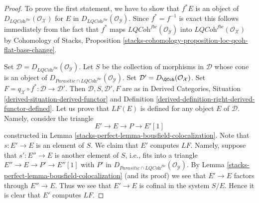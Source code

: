 \begin{proof}
To prove the first statement, we have to show that $f^*E$ is an object of
$D_{\textit{LQCoh}^{fbc}}(\mathcal{O}_\mathcal{X})$ for
$E$ in $D_{\textit{LQCoh}^{fbc}}(\mathcal{O}_\mathcal{Y})$.
Since $f^* = f^{-1}$ is exact this follows immediately from the fact that
$f^*$ maps $\textit{LQCoh}^{fbc}(\mathcal{O}_\mathcal{Y})$ into
$\textit{LQCoh}^{fbc}(\mathcal{O}_\mathcal{X})$ by
Cohomology of Stacks, Proposition
\ref{stacks-cohomology-proposition-loc-qcoh-flat-base-change}.

\medskip\noindent
Set $\mathcal{D} = D_{\textit{LQCoh}^{fbc}}(\mathcal{O}_\mathcal{Y})$.
Let $S$ be the collection of morphisms in $\mathcal{D}$
whose cone is an object of
$D_{\textit{Parasitic} \cap \textit{LQCoh}^{fbc}}(\mathcal{O}_\mathcal{Y})$.
Set $\mathcal{D}' = D_\QCoh(\mathcal{O}_\mathcal{X})$.
Set $F = q_\mathcal{X} \circ f^* : \mathcal{D} \to \mathcal{D}'$.
Then $\mathcal{D}, S, \mathcal{D}', F$ are as in
Derived Categories, Situation \ref{derived-situation-derived-functor} and
Definition \ref{derived-definition-right-derived-functor-defined}.
Let us prove that $LF(E)$ is defined for any object $E$ of $\mathcal{D}$.
Namely, consider the triangle
$$
E' \to E \to P \to E'[1]
$$
constructed in Lemma \ref{stacks-perfect-lemma-bousfield-colocalization}.
Note that $s : E' \to E$ is an element of $S$. We claim that $E'$ computes
$LF$. Namely, suppose that $s' : E'' \to E$ is another element of $S$, i.e.,
fits into a triangle $E'' \to E \to P' \to E''[1]$ with $P'$ in
$D_{\textit{Parasitic} \cap \textit{LQCoh}^{fbc}}(\mathcal{O}_\mathcal{Y})$.
By Lemma \ref{stacks-perfect-lemma-bousfield-colocalization} (and its proof)
we see that $E' \to E$ factors through $E'' \to E$. Thus we see that
$E' \to E$ is cofinal in the system $S/E$. Hence it is clear that
$E'$ computes $LF$.


\end{proof}
